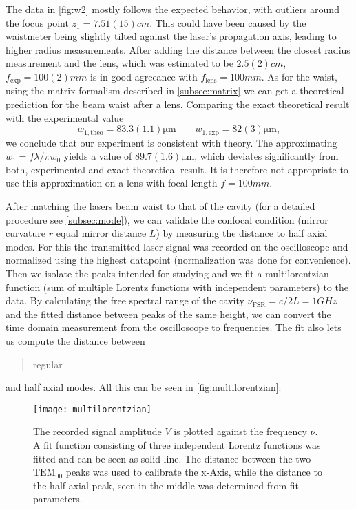 The data in \autoref{fig:w2} mostly follows the expected behavior, with outliers around the focus point $z_1 = 7.51(15) \unit{cm}$. This could have been caused by the waistmeter being slightly tilted against the laser's propagation axis, leading to higher radius measurements. After adding the distance between the closest radius measurement and the lens, which was estimated to be $2.5(2) \unit{cm}$, $f_{\mathrm{exp}} = 100(2) \unit{mm}$ is in good agreeance with $f_{\mathrm{lens}} = 100 \unit{mm}$. As for the waist, using the matrix formalism described in \autoref{subsec:matrix} we can get a theoretical prediction for the beam waist after a lens. Comparing the exact theoretical result with the experimental value
$$ w_{1, \mathrm{theo}} = 83.3(1.1) \unit{\micro\m} \qquad w_{1,\mathrm{exp}} = 82(3) \unit{\micro\m}, $$ 
we conclude that our experiment is consistent with theory. The approximating $w_1 = f\lambda/\pi w_0$ yields a value of $89.7(1.6) \unit{\micro\m}$, which deviates significantly from both, experimental and exact theoretical result. It is therefore not appropriate to use this approximation on a lens with focal length $f = 100 \unit{mm}$. 

After matching the lasers beam waist to that of the cavity (for a detailed procedure see \autoref{subsec:mode}), we can validate the confocal condition (mirror curvature $r$ equal mirror distance $L$) by measuring the distance to half axial modes. For this the transmitted laser signal was recorded on the oscilloscope and normalized using the highest datapoint (normalization was done for convenience). Then we isolate the peaks intended for studying and we fit a multilorentzian function (sum of multiple Lorentz functions with independent parameters) to the data. By calculating the free spectral range of the cavity $\nu_{\mathrm{FSR}} = c/2L = 1 \unit{GHz}$ and the fitted distance between peaks of the same height, we can convert the time domain measurement from the oscilloscope to frequencies. The fit also lets us compute the distance between \blockquote{regular} and half axial modes. All this can be seen in \autoref{fig:multilorentzian}.

\begin{figure}[H]
	\centering
	\texttt{[image: multilorentzian]}
	\caption{The recorded signal amplitude $V$ is plotted against the frequency $\nu$. A fit function consisting of three independent Lorentz functions was fitted and can be seen as solid line. The distance between the two $\mathrm{TEM}_{00}$ peaks was used to calibrate the x-Axis, while the distance to the half axial peak, seen in the middle was determined from fit parameters.}
	\label{fig:multilorentzian}
\end{figure}


